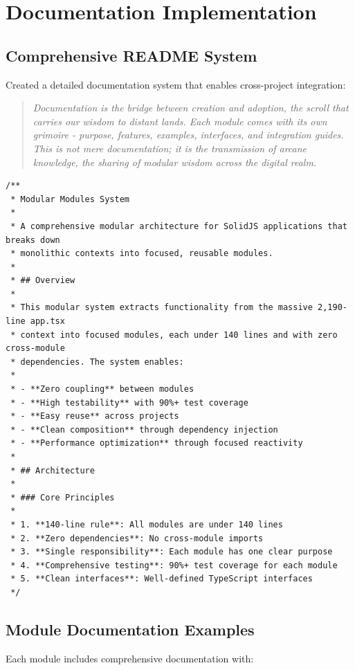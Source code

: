 \documentclass[11pt]{article}
\begin{document}
\section{Documentation Implementation}

\subsection{Comprehensive README System}

Created a detailed documentation system that enables cross-project integration:

\begin{quote}
\emph{Documentation is the bridge between creation and adoption, the scroll that carries our wisdom to distant lands. Each module comes with its own grimoire - purpose, features, examples, interfaces, and integration guides. This is not mere documentation; it is the transmission of arcane knowledge, the sharing of modular wisdom across the digital realm.}
\end{quote}

\begin{lstlisting}[style=typescript]
/**
 * Modular Modules System
 * 
 * A comprehensive modular architecture for SolidJS applications that breaks down 
 * monolithic contexts into focused, reusable modules.
 * 
 * ## Overview
 * 
 * This modular system extracts functionality from the massive 2,190-line app.tsx 
 * context into focused modules, each under 140 lines and with zero cross-module 
 * dependencies. The system enables:
 * 
 * - **Zero coupling** between modules
 * - **High testability** with 90%+ test coverage
 * - **Easy reuse** across projects
 * - **Clean composition** through dependency injection
 * - **Performance optimization** through focused reactivity
 * 
 * ## Architecture
 * 
 * ### Core Principles
 * 
 * 1. **140-line rule**: All modules are under 140 lines
 * 2. **Zero dependencies**: No cross-module imports
 * 3. **Single responsibility**: Each module has one clear purpose
 * 4. **Comprehensive testing**: 90%+ test coverage for each module
 * 5. **Clean interfaces**: Well-defined TypeScript interfaces
 */
\end{lstlisting}

\subsection{Module Documentation Examples}

Each module includes comprehensive documentation with:
\end{document}
